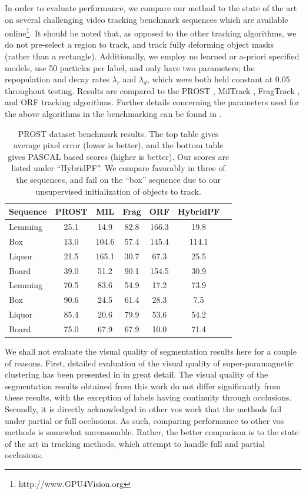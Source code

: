 In order to evaluate performance, we compare our method to the state of the art on several challenging video tracking benchmark sequences which are available online\footnote{http://www.GPU4Vision.org}. It should be noted that, as opposed to the other tracking algorithms, we do not pre-select a region to track, and track fully deforming object masks (rather than a rectangle). Additionally, we employ no learned or a-priori specified models, use 50 particles per label, and only have two parameters; the repopulation and decay rates $\lambda_r$ and $\lambda_d$, which were both held constant at $0.05$ throughout testing. Results are compared to the PROST \cite{PROST}, MilTrack \cite{MilTrack}, FragTrack \cite{FragTrack}, and ORF \cite{ORF} tracking algorithms. Further details concerning the parameters used for the above algorithms in the benchmarking can be found in \cite{PROST}.
\begin{table}[!t]
 \caption[PROST dataset benchmark results]{PROST dataset benchmark results. The top table gives average pixel error (lower is better), and the bottom table gives PASCAL based scores (higher is better). Our scores are listed under ``HybridPF''. We compare favorably in three of the sequences, and fail on the ``box'' sequence due to our unsupervised initialization of objects to track. }
\begin{center}
\begin{tabular}{|l|c|c|c|c|c|c|}
\hline
Sequence &  PROST  & MIL & Frag & ORF & HybridPF \\
\hline\hline
Lemming & 25.1 & 14.9 & 82.8 & 166.3 & 19.8\\
Box & 13.0 & 104.6 & 57.4 & 145.4 & 114.1\\
Liquor & 21.5 & 165.1 & 30.7 & 67.3 & 25.5\\
Board & 39.0 & 51.2 & 90.1 & 154.5 & 30.9\\
\hline
\hline
\hline\hline
Lemming & 70.5 & 83.6 & 54.9 & 17.2 & 73.9\\
Box & 90.6 & 24.5 & 61.4 & 28.3 & 7.5\\
Liquor & 85.4 & 20.6 & 79.9 & 53.6 & 54.2\\
Board & 75.0 & 67.9 & 67.9 & 10.0 & 71.4\\
\hline
\end{tabular}
\end{center}
\label{table:results}
\end{table}

We shall not evaluate the visual quality of segmentation results here for a couple of reasons. First, detailed evaluation of the visual quality of super-paramagnetic clustering has been presented in \cite{Abramov_RealtimeSegmentation} in great detail. The visual quality of the segmentation results obtained from this work do not differ significantly from these results, with the exception of labels having continuity through occlusions. Secondly, it is directly acknowledged in other \gls{vos} work that the methods fail under partial \cite{MSVS,PropValAgg} or full \cite{SegTrackRegions,MHVS} occlusions. As such, comparing performance to other \gls{vos} methods is somewhat unreasonable. Rather, the better comparison is to the state of the art in tracking methods, which attempt to handle full and partial occlusions.

